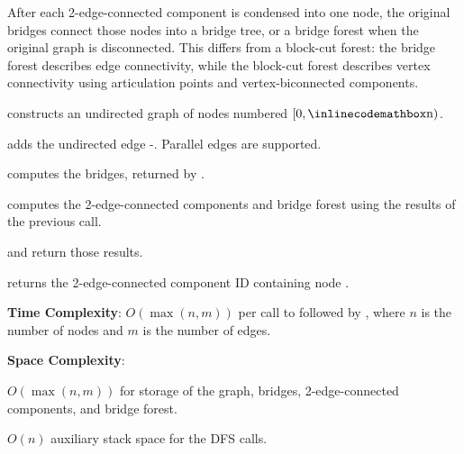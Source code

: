 After each 2-edge-connected component is condensed into one node, the original bridges connect those nodes into a bridge tree, or a bridge forest when the original graph is disconnected. This differs from a block-cut forest: the bridge forest describes edge connectivity, while the block-cut forest describes vertex connectivity using articulation points and vertex-biconnected components.

\begin{compactitem}
  \item {} constructs an undirected graph of  nodes numbered $[0, {\inlinecodemath{n}})$.
  \item {} adds the undirected edge -. Parallel edges are supported.
  \item {} computes the bridges, returned by .
  \item {} computes the 2-edge-connected components and bridge forest using the results of the previous  call.
  \item {} and  return those results.
  \item {} returns the 2-edge-connected component ID containing node .
\end{compactitem}

\textbf{Time Complexity}: $O(\max\left(n, m\right))$ per call to  followed by , where $n$ is the number of nodes and $m$ is the number of edges.

\textbf{Space Complexity}:
\begin{compactitem}
  \item $O(\max\left(n, m\right))$ for storage of the graph, bridges, 2-edge-connected components, and bridge forest.
  \item $O(n)$ auxiliary stack space for the DFS calls.
\end{compactitem}

